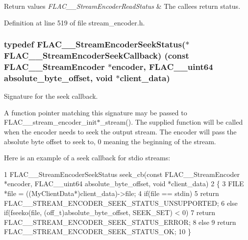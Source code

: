 \begin{DoxyRetVals}{Return values}
{\em F\+L\+A\+C\+\_\+\+\_\+\+Stream\+Encoder\+Read\+Status} & The callee\textquotesingle{}s return status. \\
\hline
\end{DoxyRetVals}


Definition at line 519 of file stream\+\_\+encoder.\+h.

\subsubsection[{\texorpdfstring{F\+L\+A\+C\+\_\+\+\_\+\+Stream\+Encoder\+Seek\+Callback}{FLAC__StreamEncoderSeekCallback}}]{\setlength{\rightskip}{0pt plus 5cm}typedef {\bf F\+L\+A\+C\+\_\+\+\_\+\+Stream\+Encoder\+Seek\+Status}($\ast$ F\+L\+A\+C\+\_\+\+\_\+\+Stream\+Encoder\+Seek\+Callback) ({\bf const} {\bf F\+L\+A\+C\+\_\+\+\_\+\+Stream\+Encoder} $\ast$encoder, {\bf F\+L\+A\+C\+\_\+\+\_\+uint64} absolute\+\_\+byte\+\_\+offset, {\bf void} $\ast$client\+\_\+data)}\hypertarget{group__flac__stream__encoder_ga70b85349d5242e4401c4d8ddf6d9bbca}{}\label{group__flac__stream__encoder_ga70b85349d5242e4401c4d8ddf6d9bbca}
Signature for the seek callback.

A function pointer matching this signature may be passed to F\+L\+A\+C\+\_\+\+\_\+stream\+\_\+encoder\+\_\+init$\ast$\+\_\+stream(). The supplied function will be called when the encoder needs to seek the output stream. The encoder will pass the absolute byte offset to seek to, 0 meaning the beginning of the stream.

Here is an example of a seek callback for stdio streams\+: 
\begin{DoxyCode}
1 FLAC\_\_StreamEncoderSeekStatus seek\_cb(const FLAC\_\_StreamEncoder *encoder, FLAC\_\_uint64
       absolute\_byte\_offset, void *client\_data)
2 \{
3   FILE *file = ((MyClientData*)client\_data)->file;
4   if(file == stdin)
5     return FLAC\_\_STREAM\_ENCODER\_SEEK\_STATUS\_UNSUPPORTED;
6   else if(fseeko(file, (off\_t)absolute\_byte\_offset, SEEK\_SET) < 0)
7     return FLAC\_\_STREAM\_ENCODER\_SEEK\_STATUS\_ERROR;
8   else
9     return FLAC\_\_STREAM\_ENCODER\_SEEK\_STATUS\_OK;
10 \}
\end{DoxyCode}


